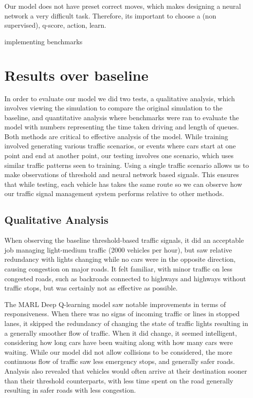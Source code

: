 \documentclass[conference]{IEEEtran}
\begin{document}
Our model does not have preset correct moves, which makes designing a neural network a very difficult task. Therefore, its important to choose a (non supervised), q-score, action, learn. 

implementing benchmarks

\section{Results over baseline}

In order to evaluate our model we did two tests, a qualitative analysis, which involves viewing the simulation to compare the original simulation to the baseline, and quantitative analysis where benchmarks were ran to evaluate the model with numbers representing the time taken driving and length of queues. Both methods are critical to effective analysis of the model. While training involved generating various traffic scenarios, or events where cars start at one point and end at another point, our testing involves one scenario, which uses similar traffic patterns seen to training. Using a single traffic scenario allows us to make observations of threshold and neural network based signals. This ensures that while testing, each vehicle has takes the same route so we can observe how our traffic signal management system performs relative to other methods. 

\subsection{Qualitative Analysis}

When observing the baseline threshold-based traffic signals, it did an acceptable job managing light-medium traffic (2000 vehicles per hour), but saw relative redundancy with lights changing while no cars were in the opposite direction, causing congestion on major roads. It felt familiar, with minor traffic on less congested roads, such as backroads connected to highways and highways without traffic stops, but was certainly not as effective as possible. 

The MARL Deep Q-learning model saw notable improvements in terms of responsiveness. When there was no signs of incoming traffic or lines in stopped lanes, it skipped the redundancy of changing the state of traffic lights resulting in a generally smoother flow of traffic. When it did change, it seemed intelligent, considering how long cars have been waiting along with how many cars were waiting. While our model did not allow collisions to be considered, the more continuous flow of traffic saw less emergency stops, and generally safer roads. Analysis also revealed that vehicles would often arrive at their destination sooner than their threshold counterparts, with less time spent on the road generally resulting in safer roads with less congestion.  
\end{document}
